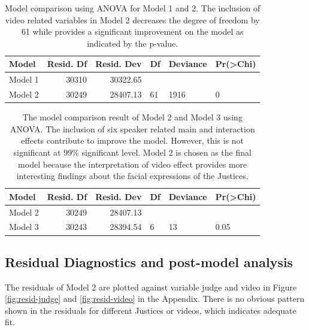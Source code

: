 \documentclass{monashthesis}
\begin{document}
\begin{table}[ht]
\begin{center}
\caption{\label{tab:anova-1}Model comparison using ANOVA for Model 1 and 2. The inclusion of video related variables in Model 2 decreases the degree of freedom by 61 while provides a significant improvement on the model as indicated by the p-value. }
\begin{tabular}{lrrlll}
\toprule
Model & Resid. Df & Resid. Dev & Df & Deviance & Pr(>Chi) \\
\midrule
Model 1 & 30310 & 30322.65 &   &   &   \\
Model 2 & 30249 & 28407.13 & 61 & 1916 &  0 \\
\bottomrule
\end{tabular}
\end{center}
\end{table}

\begin{table}[ht]
\begin{center}
\caption{\label{tab:anova-2}The model comparison result of Model 2 and Model 3 using ANOVA. The inclusion of six speaker related main and interaction effects contribute to improve the model. However, this is not significant at 99\% significant level. Model 2 is chosen as the final model because the interpretation of video effect provides more interesting findings about the facial expressions of the Justices. }
\begin{tabular}{lrrlll}
\toprule
Model & Resid. Df & Resid. Dev & Df & Deviance & Pr(>Chi) \\
\midrule
Model 2 & 30249 & 28407.13 &   &   &   \\
Model 3 & 30243 & 28394.54 & 6 & 13 & 0.05 \\
\bottomrule
\end{tabular}
\end{center}
\end{table}

\hypertarget{residual-diagnostics-and-post-model-analysis}{%
\subsection{Residual Diagnostics and post-model analysis}\label{residual-diagnostics-and-post-model-analysis}}

The residuals of Model 2 are plotted against variable judge and video in Figure \ref{fig:resid-judge} and \ref{fig:resid-video} in the Appendix. There is no obvious pattern shown in the residuals for different Justices or videos, which indicates adequate fit.
\end{document}
